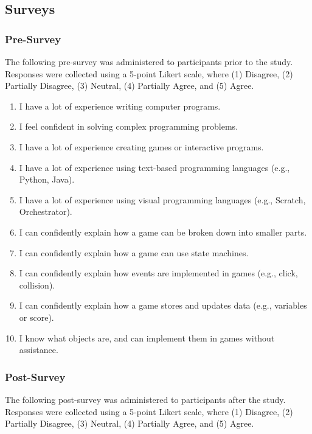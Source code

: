 \subsection{Surveys}
\subsubsection{Pre-Survey}

The following pre-survey was administered to participants prior to the study. Responses were collected using a 5-point Likert scale, where (1) Disagree, (2) Partially Disagree, (3) Neutral, (4) Partially Agree, and (5) Agree.

\begin{enumerate}
	\item I have a lot of experience writing computer programs.
	\item I feel confident in solving complex programming problems.
	\item I have a lot of experience creating games or interactive programs.
	\item I have a lot of experience using text-based programming languages (e.g., Python, Java).
	\item I have a lot of experience using visual programming languages (e.g., Scratch, Orchestrator).
	\item I can confidently explain how a game can be broken down into smaller parts.
	\item I can confidently explain how a game can use state machines.
	\item I can confidently explain how events are implemented in games (e.g., click, collision).
	\item I can confidently explain how a game stores and updates data (e.g., variables or score).
	\item I know what objects are, and can implement them in games without assistance.
\end{enumerate}

\subsubsection{Post-Survey}

The following post-survey was administered to participants after the study. Responses were collected using a 5-point Likert scale, where (1) Disagree, (2) Partially Disagree, (3) Neutral, (4) Partially Agree, and (5) Agree.

